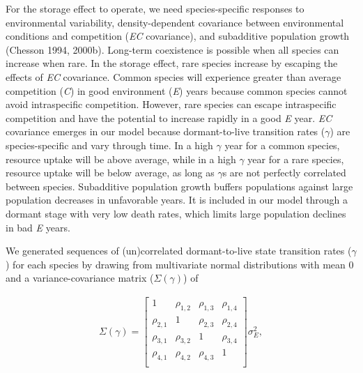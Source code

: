 \documentclass[12pt,]{article}
\begin{document}
For the storage effect to operate, we need species-specific responses to
environmental variability, density-dependent covariance between
environmental conditions and competition (\emph{EC} covariance), and
subadditive population growth (Chesson 1994, 2000b). Long-term
coexistence is possible when all species can increase when rare. In the
storage effect, rare species increase by escaping the effects of
\emph{EC} covariance. Common species will experience greater than
average competition (\emph{C}) in good environment (\emph{E}) years
because common species cannot avoid intraspecific competition. However,
rare species can escape intraspecific competition and have the potential
to increase rapidly in a good \emph{E} year. \emph{EC} covariance
emerges in our model because dormant-to-live transition rates
(\(\gamma\)) are species-specific and vary through time. In a high
\(\gamma\) year for a common species, resource uptake will be above
average, while in a high \(\gamma\) year for a rare species, resource
uptake will be below average, as long as \(\gamma\)s are not perfectly
correlated between species.
Subadditive population growth buffers populations against large
population decreases in unfavorable years. It is included in our model
through a dormant stage with very low death rates, which limits large
population declines in bad \emph{E} years.

We generated sequences of (un)correlated dormant-to-live state
transition rates (\(\gamma\)) for each species by drawing from
multivariate normal distributions with mean 0 and a variance-covariance
matrix (\(\Sigma(\gamma)\)) of \vspace{-3em}

\begin{align}
\Sigma(\gamma) = 
\begin{bmatrix}
1 & \rho_{1,2} & \rho_{1,3} & \rho_{1,4} \\
\rho_{2,1} & 1 & \rho_{2,3} & \rho_{2,4} \\
\rho_{3,1} & \rho_{3,2} & 1  & \rho_{3,4} \\
\rho_{4,1} & \rho_{4,2} & \rho_{4,3} & 1  \\
\end{bmatrix}
\sigma_{E}^2,
\end{align}\vspace{-2em}
\end{document}
